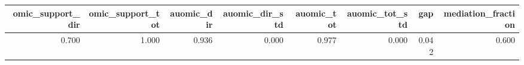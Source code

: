 \begin{tabular}{rrrrrrrr}
\toprule
omic_support_dir & omic_support_tot & auomic_dir & auomic_dir_std & auomic_tot & auomic_tot_std & gap & mediation_fraction \\
\midrule
0.700 & 1.000 & 0.936 & 0.000 & 0.977 & 0.000 & 0.042 & 0.600 \\
\bottomrule
\end{tabular}
